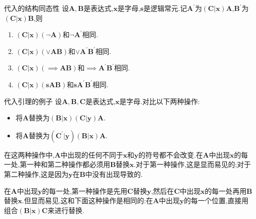 \begin{metatheorem}{代入的结构同态性}{}
	设$\boldsymbol{A},\boldsymbol{B}$是表达式,$\boldsymbol{x}$是字母,$\boldsymbol{s}$是逻辑常元.记$\boldsymbol{A}^{\prime}$为$\left(\boldsymbol{C}|\boldsymbol{x}\right)\boldsymbol{A}$,$\boldsymbol{B}^{\prime}$为$\left(\boldsymbol{C}|\boldsymbol{x}\right)\boldsymbol{B}$,则
	\begin{enumerate}
		\item $\left(\boldsymbol{C}|\boldsymbol{x}\right)\left(\neg\boldsymbol{A}\right)$和$\neg\boldsymbol{A}^{\prime}$相同.
		\item $\left(\boldsymbol{C}|\boldsymbol{x}\right)\left(\vee\boldsymbol{A}\boldsymbol{B}\right)$和$\vee\boldsymbol{A}^{\prime}\boldsymbol{B}^{\prime}$相同.
		\item $\left(\boldsymbol{C}|\boldsymbol{x}\right)\left(\implies\boldsymbol{A}\boldsymbol{B}\right)$和$\implies\boldsymbol{A}^{\prime}\boldsymbol{B}^{\prime}$相同.
		\item $\left(\boldsymbol{C}|\boldsymbol{x}\right)\left(\boldsymbol{s}\boldsymbol{A}\boldsymbol{B}\right)$和$\boldsymbol{s}\boldsymbol{A}^{\prime}\boldsymbol{B}^{\prime}$相同.
	\end{enumerate}
\end{metatheorem}

\begin{example}{代入引理的例子}{}
	设$\boldsymbol{A},\boldsymbol{B},\boldsymbol{C}$是表达式,$\boldsymbol{x}$是字母.对比以下两种操作:
	\begin{itemize}
		\item 将$\boldsymbol{A}$替换为$\left(\boldsymbol{B}|\boldsymbol{x}\right)\left(\boldsymbol{C}|\boldsymbol{y}\right)\boldsymbol{A}$.
		\item 将$\boldsymbol{A}$替换为$\left(\boldsymbol{C}^{\prime}|\boldsymbol{y}\right)\left(\boldsymbol{B}|\boldsymbol{x}\right)\boldsymbol{A}$.
	\end{itemize}
	在这两种操作中,$\boldsymbol{A}$中出现的任何不同于$\boldsymbol{x}$和$\boldsymbol{y}$的符号都不会改变.在$\boldsymbol{A}$中出现$\boldsymbol{x}$的每一处,第一种和第二种操作都必须用$\boldsymbol{B}$替换$\boldsymbol{x}$.对于第一种操作,这是显而易见的;对于第二种操作,这是因为$\boldsymbol{y}$在$\boldsymbol{B}$中没有出现导致的.
	
	在$\boldsymbol{A}$中出现$\boldsymbol{y}$的每一处,第一种操作是先用$\boldsymbol{C}$替换$\boldsymbol{y}$,然后在$\boldsymbol{C}$中出现$\boldsymbol{x}$的每一处再用$\boldsymbol{B}$替换$\boldsymbol{x}$.但显而易见,这和下面这种操作是相同的:在$\boldsymbol{A}$中出现$\boldsymbol{y}$的每一个位置,直接用组合$\left(\boldsymbol{B}|\boldsymbol{x}\right)\boldsymbol{C}$来进行替换.
\end{example}




















